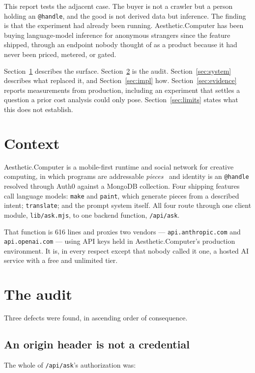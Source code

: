 \documentclass[10pt,letterpaper,twocolumn]{article}
\newcommand{\acdot}{{\color{acpink}.}}
\newcommand{\ac}{Aesthetic{\acdot}Computer}
\newcommand{\code}[1]{\texttt{#1}}
\begin{document}
This report tests the adjacent case. The buyer is not a crawler but a person
holding an \code{@handle}, and the good is not derived data but inference. The
finding is that the experiment had already been running. \ac{} has been buying
language-model inference for anonymous strangers since the feature shipped,
through an endpoint nobody thought of as a product because it had never been
priced, metered, or gated.

Section~\ref{sec:context} describes the surface. Section~\ref{sec:defect} is the
audit. Section~\ref{sec:system} describes what replaced it, and
Section~\ref{sec:impl} how. Section~\ref{sec:evidence} reports measurements from
production, including an experiment that settles a question a prior cost analysis
could only pose. Section~\ref{sec:limits} states what this does not establish.

\section{Context}
\label{sec:context}

\ac{} is a mobile-first runtime and social network for creative computing, in
which programs are addressable \emph{pieces}~\citep{scudder2026pieces} and
identity is an \code{@handle} resolved through Auth0 against a MongoDB
collection. Four shipping features call language models: \code{make} and
\code{paint}, which generate pieces from a described intent; \code{translate};
and the prompt system itself. All four route through one client module,
\code{lib/ask.mjs}, to one backend function, \code{/api/ask}.

That function is 616 lines and proxies two vendors --- \code{api.anthropic.com}
and \code{api.openai.com} --- using API keys held in \ac{}'s production
environment. It is, in every respect except that nobody called it one, a hosted
AI service with a free and unlimited tier.

\section{The audit}
\label{sec:defect}

Three defects were found, in ascending order of consequence.

\subsection{An origin header is not a credential}

The whole of \code{/api/ask}'s authorization was:
\end{document}
